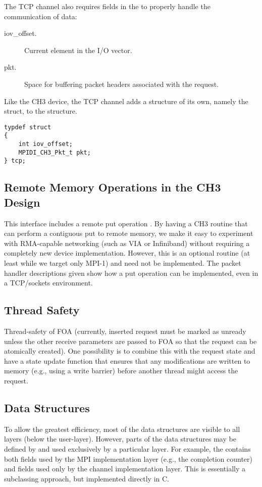 \documentclass{article}
\begin{document}
The TCP channel also requires fields in the  to
properly handle the communication of data:
\begin{description}
\item[iov\_offset.]Current element in the I/O vector.
\item[pkt.]Space for buffering packet headers associated with the request.
\end{description}

Like the CH3 device, the TCP channel adds a structure of its own,
namely the  struct, to the  structure.
\begin{verbatim}
typdef struct
{
    int iov_offset;
    MPIDI_CH3_Pkt_t pkt;
} tcp;
\end{verbatim}

\subsection{Remote Memory Operations in the CH3 Design}
This interface includes a remote put operation .
By having a CH3 routine that can perform a contiguous put to remote memory, we
make it easy to experiment with RMA-capable networking (such as VIA or
Infiniband) without 
requiring a completely new device implementation.  However, this is an
optional routine (at least while we target only MPI-1) and need not be
implemented.  The packet handler descriptions given show how a put
operation can be implemented, even in a TCP/sockets environment.

\subsection{Thread Safety}


Thread-safety of FOA (currently, inserted request must be marked as unready
unless the other receive parameters are passed to FOA so that the request can
be atomically created).  One possibility is to combine this with the request
state and have a state update function that ensures that any modifications are
written to memory (e.g., using a write barrier) before another thread might
access the request.

\subsection{Data Structures}
To allow the greatest efficiency, most of the data structures are
visible to all layers (below the user-layer).  However, parts of the
data structures may be defined by and used exclusively by a particular
layer.  For example, the  contains both fields used
by the MPI implementation layer (e.g., the completion counter) and
fields used only by the channel implementation layer.  This is
essentially a subclassing approach, but implemented directly in C.
\end{document}
